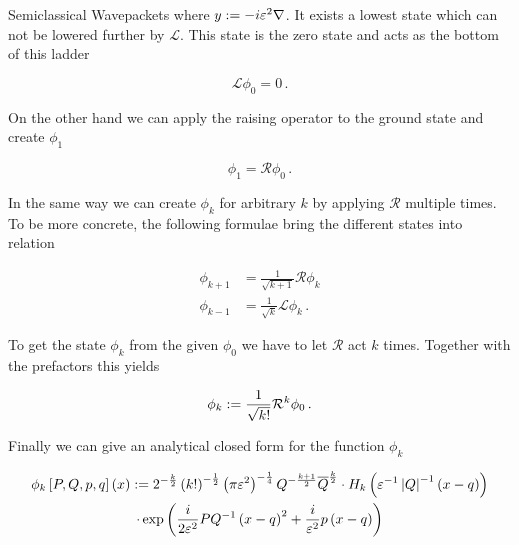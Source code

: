 \begin{chapter}{Semiclassical Wavepackets}
where $y := -i \varepsilon^2 \nabla$. It exists a lowest state which can not
be lowered further by $\mathcal{L}$. This state is the zero state and acts as the
bottom of this ladder

\begin{equation} \label{eq:ladder_ops_base}
  \mathcal{L} \phi_0 = 0 \,.
\end{equation}

On the other hand we can apply the raising operator to the ground state and create $\phi_1$

\begin{equation} \label{eq:ladder_ops_phi_0}
  \phi_1 = \mathcal{R} \phi_0 \,.
\end{equation}

In the same way we can create $\phi_k$ for arbitrary $k$ by applying $\mathcal{R}$
multiple times. To be more concrete, the following formulae bring the different
states into relation

\begin{equation} \label{eq:applied_ladder_ops}
\begin{split}
  \phi_{k+1} & = \frac{1}{\sqrt{k+1}} \mathcal{R} \phi_k \\
  \phi_{k-1} & = \frac{1}{\sqrt{k}} \mathcal{L} \phi_k \,.
\end{split}
\end{equation}

To get the state $\phi_k$ from the given $\phi_0$ we have to let $\mathcal{R}$ act $k$
times. Together with the prefactors this yields

\begin{equation}
  \phi_k := \frac{1}{\sqrt{k!}} \mathcal{R}^k \phi_0 \,.
\end{equation}

Finally we can give an analytical closed form for the function $\phi_k$

\begin{multline} \label{eq:hagedorn_kstate_1d}
  \phi_k \left[ P,Q,p,q \right] \left( x \right)
  :=
  2^{-\frac{k}{2}}\left(k!\right)^{-\frac{1}{2}}\left(\pi\varepsilon^2\right)^{-\frac{1}{4}} Q^{-\frac{k+1}{2}}\overline{Q}^{\frac{k}{2}}
  \cdot H_k\left( \varepsilon^{-1}\left|Q\right|^{-1}\left(x-q\right) \right) \\
  \cdot \exp \left(\frac{i}{2\varepsilon^2} PQ^{-1}\left(x-q\right)^2 + \frac{i}{\varepsilon^2} p\left(x-q\right) \right)
\end{multline}


\end{chapter}
